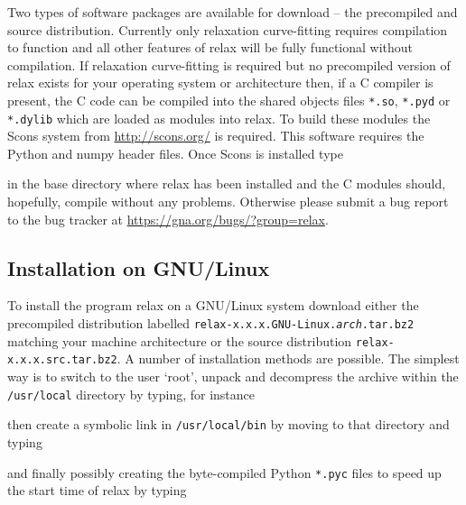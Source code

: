 Two types of software packages are available for download -- the precompiled and source distribution.  Currently only relaxation curve-fitting requires compilation to function and all other features of relax will be fully functional without compilation.  If relaxation curve-fitting is required but no precompiled version of relax exists for your operating system or architecture then, if a C compiler is present, the C code can be compiled into the shared objects files \texttt{*.so}, \texttt{*.pyd} or \texttt{*.dylib} which are loaded as modules into relax.  To build these modules the Scons system from \href{http://scons.org/}{http://scons.org/} is required.  This software requires the Python and numpy header files.  Once Scons is installed type


in the base directory where relax has been installed and the C modules should, hopefully, compile without any problems.  Otherwise please submit a bug report to the bug tracker at \href{https://gna.org/bugs/?group=relax}{https://gna.org/bugs/?group=relax}.



\subsection{Installation on GNU/Linux}

To install the program relax on a GNU/Linux system download either the precompiled distribution labelled \texttt{relax-x.x.x.GNU-Linux.\textit{arch}.tar.bz2} matching your machine architecture or the source distribution \texttt{relax-x.x.x.src.tar.bz2}.  A number of installation methods are possible.  The simplest way is to switch to the user `root', unpack and decompress the archive within the \texttt{/usr/local} directory by typing, for instance


then create a symbolic link in \texttt{/usr/local/bin} by moving to that directory and typing


and finally possibly creating the byte-compiled Python \texttt{*.pyc} files to speed up the start time of relax by typing


